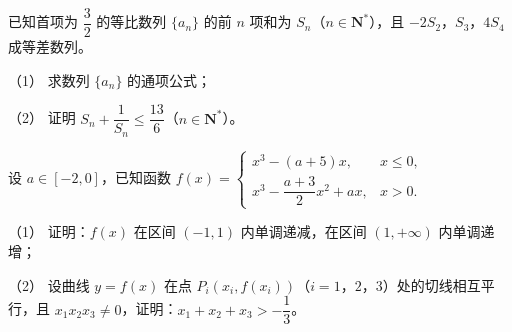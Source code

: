 \begin{question}
已知首项为 $\dfrac32$ 的等比数列 $\{a_n\}$ 的前 $n$ 项和为 $S_n$（$n\in\mathbf N^*$），且 $-2S_2$，$S_3$，$4S_4$ 成等差数列。

（1） 求数列 $\{a_n\}$ 的通项公式；

（2） 证明 $S_n+\dfrac1{S_n}\leqslant\dfrac{13}6$（$n\in\mathbf N^*$）。

\end{question}
\begin{question}
设 $a\in[-2,0]$，已知函数 $f(x)=\begin{cases}x^3-(a+5)x, & x\leqslant0,\\ x^3-\dfrac{a+3}2x^2+ax, & x>0.\end{cases}$

（1） 证明：$f(x)$ 在区间 $(-1,1)$ 内单调递减，在区间 $(1,+\infty)$ 内单调递增；

（2） 设曲线 $y=f(x)$ 在点 $P_i(x_i,f(x_i))$（$i=1$，$2$，$3$）处的切线相互平行，且 $x_1x_2x_3\neq0$，证明：$x_1+x_2+x_3>-\dfrac13$。

\end{question}